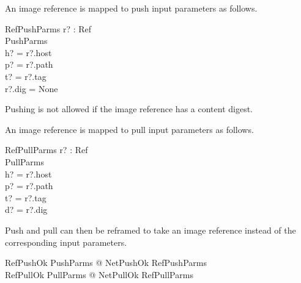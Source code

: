 \documentclass[a4paper,twoside,12pt]{article}
\begin{document}
\begin{samepage}
An image reference is mapped to push input parameters as follows.
\begin{schema}{RefPushParms}
    r? : Ref \\
    PushParms \\
\where
    h? = r?.host \\
    p? = r?.path \\
    t? = r?.tag \\
    r?.dig = None \\
\end{schema}
Pushing is not allowed if the image reference has a content digest.
\end{samepage}

An image reference is mapped to pull input parameters as follows.
\begin{schema}{RefPullParms}
    r? : Ref \\
    PullParms \\
\where
    h? = r?.host \\
    p? = r?.path \\
    t? = r?.tag \\
    d? = r?.dig \\
\end{schema}

Push and pull can then be reframed to take an image reference instead of the corresponding input parameters.
\begin{zed}
  RefPushOk  \exists PushParms @ NetPushOk \land RefPushParms \\
  RefPullOk  \exists PullParms @ NetPullOk \land RefPullParms \\
\end{zed}



\clearpage

\appendix



\end{document}
